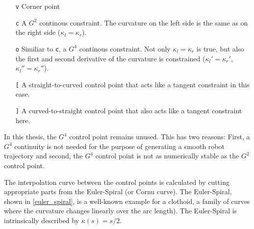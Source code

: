 \begin{itemize}
\item[\texttt{v}] Corner point
\item[\texttt{c}] A $G^2$ continous constraint. The curvature  on the left side is the same as on the right side ($\kappa_l = \kappa_r$).
\item[\texttt{o}] Similiar to \texttt{c}, a $G^4$ continous constraint. Not only $\kappa_l = \kappa_r$ is true, but also the first and second derivative of the curvature is constrained ($\kappa_l' = \kappa_r'$, $\kappa_l'' = \kappa_r''$).
\item[\texttt{[}] A straight-to-curved control point that acts like a tangent constraint in this case.
\item[\texttt{]}] A curved-to-straight control point that also acts like a tangent constraint here.
\end{itemize}

In this thesis, the $G^4$ control point remains unused. This has two reasons: First, a $G^4$ continuity is not needed for the purpose of generating a smooth robot trajectory and second, the $G^4$ control point is not as numerically stable as the $G^2$ control point.

The interpolation curve between the control points is calculated by cutting appropriate parts from the Euler-Spiral (or Cornu curve). The Euler-Spiral, shown in \autoref{euler_spiral}, is a well-known example for a clothoid, a family of curves where the curvature changes linearly over the arc length). The Euler-Spiral is intrinsically described by $\kappa(s) = s/2$.

